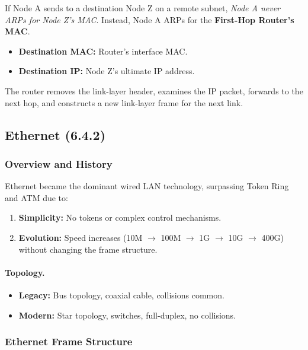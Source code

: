 \documentclass[12pt]{article}
\begin{document}
If Node A sends to a destination Node Z on a remote subnet, \emph{Node A never ARPs for Node Z's MAC}.
Instead, Node A ARPs for the \textbf{First-Hop Router's MAC}.

\begin{itemize}
    \item \textbf{Destination MAC:} Router’s interface MAC.
    \item \textbf{Destination IP:} Node Z’s ultimate IP address.
\end{itemize}

The router removes the link-layer header, examines the IP packet, forwards to the next hop, and constructs a new link-layer frame for the next link.

\subsection{Ethernet (6.4.2)}

\subsubsection{Overview and History}

Ethernet became the dominant wired LAN technology, surpassing Token Ring and ATM due to:
\begin{enumerate}
    \item \textbf{Simplicity:} No tokens or complex control mechanisms.
    \item \textbf{Evolution:} Speed increases (10M $\rightarrow$ 100M $\rightarrow$ 1G $\rightarrow$ 10G $\rightarrow$ 400G) without changing the frame structure.
\end{enumerate}

\paragraph{Topology.}
\begin{itemize}
    \item \textbf{Legacy:} Bus topology, coaxial cable, collisions common.
    \item \textbf{Modern:} Star topology, switches, full-duplex, no collisions.
\end{itemize}

\subsubsection{Ethernet Frame Structure}
\end{document}
